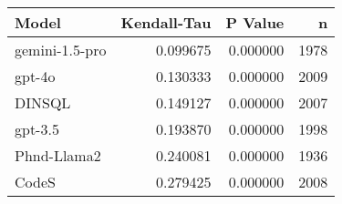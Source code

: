 \begin{tabular}{lrrr}
\toprule
Model & Kendall-Tau & P Value & n \\
\midrule
gemini-1.5-pro & 0.099675 & 0.000000 & 1978 \\
gpt-4o & 0.130333 & 0.000000 & 2009 \\
DINSQL & 0.149127 & 0.000000 & 2007 \\
gpt-3.5 & 0.193870 & 0.000000 & 1998 \\
Phnd-Llama2 & 0.240081 & 0.000000 & 1936 \\
CodeS & 0.279425 & 0.000000 & 2008 \\
\bottomrule
\end{tabular}

